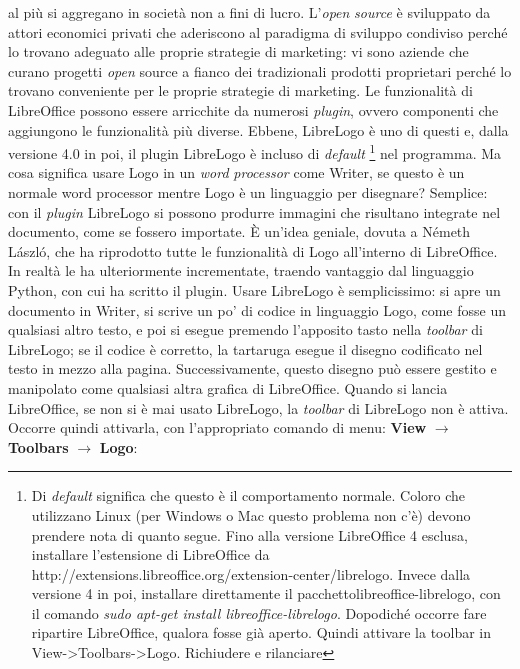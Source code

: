 al più si aggregano in società non a fini di lucro. L'\textit{open} \textit{source} è sviluppato da attori economici privati che aderiscono al paradigma di sviluppo condiviso perché lo trovano adeguato alle proprie strategie di marketing: vi sono aziende che curano progetti \textit{open\textit{}} source a fianco dei tradizionali prodotti proprietari perché lo trovano conveniente per le proprie strategie di marketing. Le funzionalità di LibreOffice possono essere arricchite da numerosi \textit{plugin}, ovvero componenti che aggiungono le funzionalità più diverse. Ebbene, LibreLogo è uno di questi e, dalla versione 4.0 in poi, il plugin LibreLogo è incluso di \textit{default} \footnote{Di \textit{default} significa che questo è il comportamento normale. Coloro che utilizzano Linux (per Windows o Mac questo problema non c'è) devono prendere nota di quanto segue. Fino alla versione LibreOffice 4 esclusa, installare l'estensione di LibreOffice da http://extensions.libreoffice.org/extension-center/librelogo. Invece dalla versione 4 in poi, installare direttamente il pacchettolibreoffice-librelogo, con il comando \textit{sudo apt-get install libreoffice-librelogo}. Dopodiché occorre fare ripartire LibreOffice, qualora fosse già aperto. Quindi attivare la toolbar in View->Toolbars->Logo. Richiudere e rilanciare
} nel programma. Ma cosa significa usare Logo in un \textit{word} \textit{processor} come Writer, se questo è un normale word processor mentre Logo è un linguaggio per disegnare? Semplice: con il \textit{plugin} LibreLogo si possono produrre immagini che risultano integrate nel documento, come se fossero importate. È un'idea geniale, dovuta a Németh László, che ha riprodotto tutte le funzionalità di Logo all'interno di LibreOffice. In  realtà le ha ulteriormente incrementate, traendo vantaggio dal linguaggio Python, con cui ha scritto il plugin. Usare LibreLogo è semplicissimo: si apre un documento in Writer, si scrive un po' di codice in linguaggio Logo, come fosse un qualsiasi altro testo, e poi si esegue premendo l'apposito tasto nella \textit{toolbar} di LibreLogo; se il codice è corretto, la tartaruga esegue il disegno codificato nel testo in mezzo alla pagina. Successivamente, questo disegno può essere gestito e manipolato come qualsiasi altra grafica di LibreOffice. Quando si lancia LibreOffice, se non si è mai usato LibreLogo, la \textit{toolbar} di LibreLogo non è attiva. Occorre quindi attivarla, con l'appropriato comando di menu: \textbf{View} $\rightarrow$ \textbf{Toolbars} $\rightarrow$ \textbf{Logo}: 

